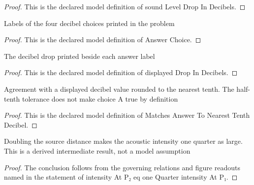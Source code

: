\begin{proof}
  This is the declared model definition of sound Level Drop In Decibels.
\end{proof}
\begin{definition}
  \label{def:physics:phyx-mini-0191:phyxminiproblems-problemphyxmini0191-answerchoice}
  Labels of the four decibel choices printed in the problem
\end{definition}
\begin{proof}
  This is the declared model definition of Answer Choice.
\end{proof}
\begin{definition}
  \label{def:physics:phyx-mini-0191:phyxminiproblems-problemphyxmini0191-displayeddropindecibels}
  The decibel drop printed beside each answer label
\end{definition}
\begin{proof}
  This is the declared model definition of displayed Drop In Decibels.
\end{proof}
\begin{definition}
  \label{def:physics:phyx-mini-0191:phyxminiproblems-problemphyxmini0191-matchesanswertonearesttenthdecibel}
  Agreement with a displayed decibel value rounded to the nearest tenth. The half-tenth tolerance does not make choice A true by definition
\end{definition}
\begin{proof}
  This is the declared model definition of Matches Answer To Nearest Tenth Decibel.
\end{proof}
\begin{lemma}
  \label{lem:physics:phyx-mini-0191:phyxminiproblems-problemphyxmini0191-intensityatp-eq-onequarter-intensityatp}
  Doubling the source distance makes the acoustic intensity one quarter as large. This is a derived intermediate result, not a model assumption
\end{lemma}
\begin{proof}
  The conclusion follows from the governing relations and figure readouts named in the statement of intensity At P₂ eq one Quarter intensity At P₁.
\end{proof}
